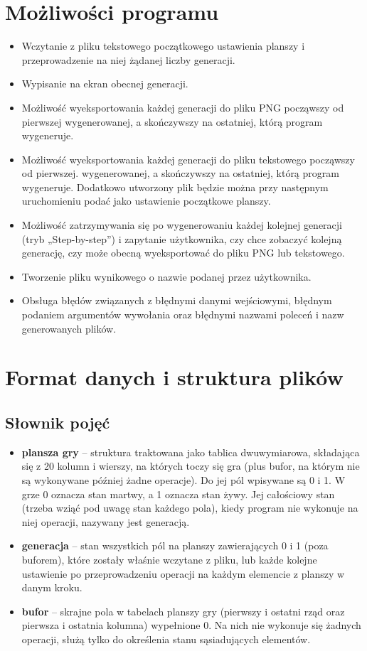 \documentclass[12pt]{report}
\begin{document}
\section{Możliwości programu}
\begin{itemize}
    \item Wczytanie z pliku tekstowego początkowego ustawienia planszy i przeprowadzenie na niej żądanej liczby generacji.
    \item Wypisanie na ekran obecnej generacji.
    \item Możliwość wyeksportowania każdej generacji do pliku PNG począwszy od pierwszej wygenerowanej, a skończywszy na ostatniej, którą program wygeneruje.
    \item Możliwość wyeksportowania każdej generacji do pliku tekstowego począwszy od pierwszej. wygenerowanej, a skończywszy na ostatniej, którą program wygeneruje. Dodatkowo utworzony plik będzie można przy następnym uruchomieniu podać jako ustawienie początkowe planszy.
    \item Możliwość zatrzymywania się po wygenerowaniu każdej kolejnej generacji (tryb „Step-by-step”) i zapytanie użytkownika, czy chce zobaczyć kolejną generację, czy może obecną wyeksportować do pliku PNG lub tekstowego.
    \item Tworzenie pliku wynikowego o nazwie podanej przez użytkownika.
    \item Obsługa błędów związanych z błędnymi danymi wejściowymi, błędnym podaniem argumentów wywołania oraz błędnymi nazwami poleceń i nazw generowanych plików.
\end{itemize}
\section{Format danych i struktura plików}
\subsection{Słownik pojęć}
\begin{itemize}
    \item \textbf{plansza gry} – struktura traktowana jako tablica dwuwymiarowa, składająca się z 20 kolumn i wierszy, na których toczy się gra (plus bufor, na którym nie są wykonywane później żadne operacje). Do jej pól wpisywane są 0 i 1. W grze 0 oznacza stan martwy, a 1 oznacza stan żywy. Jej całościowy stan (trzeba wziąć pod uwagę stan każdego pola), kiedy program nie wykonuje na niej operacji, nazywany jest generacją.
    \item \textbf{generacja} – stan wszystkich pól na planszy zawierających 0 i 1 (poza buforem), które zostały właśnie wczytane z pliku, lub każde kolejne ustawienie po przeprowadzeniu operacji na każdym elemencie z planszy w danym kroku.
    \item \textbf{bufor} – skrajne pola w tabelach planszy gry (pierwszy i ostatni rząd oraz pierwsza i ostatnia kolumna) wypełnione 0. Na nich nie wykonuje się żadnych operacji, służą tylko do określenia stanu sąsiadujących elementów.
\end{itemize}
\end{document}

